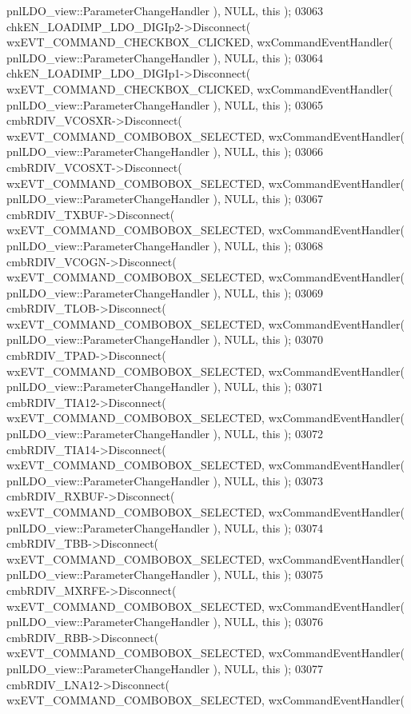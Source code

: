 \begin{DoxyCode}
      pnlLDO_view::ParameterChangeHandler ), NULL, \textcolor{keyword}{this} );
03063     chkEN_LOADIMP_LDO_DIGIp2->Disconnect( wxEVT\_COMMAND\_CHECKBOX\_CLICKED, wxCommandEventHandler( 
      pnlLDO_view::ParameterChangeHandler ), NULL, \textcolor{keyword}{this} );
03064     chkEN_LOADIMP_LDO_DIGIp1->Disconnect( wxEVT\_COMMAND\_CHECKBOX\_CLICKED, wxCommandEventHandler( 
      pnlLDO_view::ParameterChangeHandler ), NULL, \textcolor{keyword}{this} );
03065     cmbRDIV_VCOSXR->Disconnect( wxEVT\_COMMAND\_COMBOBOX\_SELECTED, wxCommandEventHandler( 
      pnlLDO_view::ParameterChangeHandler ), NULL, \textcolor{keyword}{this} );
03066     cmbRDIV_VCOSXT->Disconnect( wxEVT\_COMMAND\_COMBOBOX\_SELECTED, wxCommandEventHandler( 
      pnlLDO_view::ParameterChangeHandler ), NULL, \textcolor{keyword}{this} );
03067     cmbRDIV_TXBUF->Disconnect( wxEVT\_COMMAND\_COMBOBOX\_SELECTED, wxCommandEventHandler( 
      pnlLDO_view::ParameterChangeHandler ), NULL, \textcolor{keyword}{this} );
03068     cmbRDIV_VCOGN->Disconnect( wxEVT\_COMMAND\_COMBOBOX\_SELECTED, wxCommandEventHandler( 
      pnlLDO_view::ParameterChangeHandler ), NULL, \textcolor{keyword}{this} );
03069     cmbRDIV_TLOB->Disconnect( wxEVT\_COMMAND\_COMBOBOX\_SELECTED, wxCommandEventHandler( 
      pnlLDO_view::ParameterChangeHandler ), NULL, \textcolor{keyword}{this} );
03070     cmbRDIV_TPAD->Disconnect( wxEVT\_COMMAND\_COMBOBOX\_SELECTED, wxCommandEventHandler( 
      pnlLDO_view::ParameterChangeHandler ), NULL, \textcolor{keyword}{this} );
03071     cmbRDIV_TIA12->Disconnect( wxEVT\_COMMAND\_COMBOBOX\_SELECTED, wxCommandEventHandler( 
      pnlLDO_view::ParameterChangeHandler ), NULL, \textcolor{keyword}{this} );
03072     cmbRDIV_TIA14->Disconnect( wxEVT\_COMMAND\_COMBOBOX\_SELECTED, wxCommandEventHandler( 
      pnlLDO_view::ParameterChangeHandler ), NULL, \textcolor{keyword}{this} );
03073     cmbRDIV_RXBUF->Disconnect( wxEVT\_COMMAND\_COMBOBOX\_SELECTED, wxCommandEventHandler( 
      pnlLDO_view::ParameterChangeHandler ), NULL, \textcolor{keyword}{this} );
03074     cmbRDIV_TBB->Disconnect( wxEVT\_COMMAND\_COMBOBOX\_SELECTED, wxCommandEventHandler( 
      pnlLDO_view::ParameterChangeHandler ), NULL, \textcolor{keyword}{this} );
03075     cmbRDIV_MXRFE->Disconnect( wxEVT\_COMMAND\_COMBOBOX\_SELECTED, wxCommandEventHandler( 
      pnlLDO_view::ParameterChangeHandler ), NULL, \textcolor{keyword}{this} );
03076     cmbRDIV_RBB->Disconnect( wxEVT\_COMMAND\_COMBOBOX\_SELECTED, wxCommandEventHandler( 
      pnlLDO_view::ParameterChangeHandler ), NULL, \textcolor{keyword}{this} );
03077     cmbRDIV_LNA12->Disconnect( wxEVT\_COMMAND\_COMBOBOX\_SELECTED, wxCommandEventHandler( 

\end{DoxyCode}
